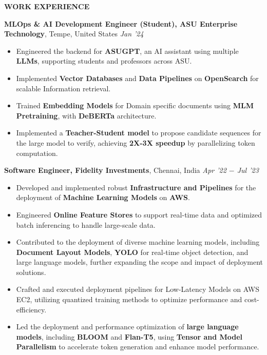 \documentclass[10pt,a4]{article}
\def\hrulefill{\leavevmode\leaders\hrule height 1pt\hfill\kern0pt}		%
\begin{document}
{		
		
\begin{flushleft}
    {\Large \textbf{WORK EXPERIENCE}} %

    \vspace{1.5mm}
    \textbf{\large MLOps \& AI Development Engineer (Student), ASU Enterprise Technology},   Tempe, United States \hfill \textit{\large Jan '24}	\\
    \begin{itemize}
        \item Engineered the backend for \textbf{ASUGPT}, an AI assistant using multiple \textbf{LLMs}, supporting students and professors across ASU.
        \item Implemented \textbf{Vector Databases} and \textbf{Data Pipelines} on \textbf{OpenSearch} for scalable Information retrieval.
        \item Trained \textbf{Embedding Models} for Domain specific documents using \textbf{MLM Pretraining}, with  \textbf{DeBERTa} architecture.
        \item Implemented a \textbf{Teacher-Student model} to propose candidate sequences for the large model to verify, achieving \textbf{2X-3X speedup} by parallelizing token computation.
    
    \end{itemize}	
    \vspace{0.5mm}
    \textbf{\large Software Engineer, Fidelity Investments},  Chennai, India \hfill \textit{\large Apr '22 $-$ Jul '23}	\\
    \begin{itemize}
        \item Developed and implemented robust \textbf{Infrastructure and Pipelines} for the deployment of \textbf{Machine Learning Models} on \textbf{AWS}.  
         \item Engineered \textbf{Online Feature Stores} to support real-time data and optimized batch inferencing to handle large-scale data.
         \item Contributed to the deployment of diverse machine learning models, including \textbf{Document Layout Models}, \textbf{YOLO} for real-time object detection, and large language models, further expanding the scope and impact of deployment solutions.
         \item Crafted and executed deployment pipelines for Low-Latency Models on AWS EC2, utilizing quantized training methods to optimize performance and cost-efficiency. 
         \item Led the deployment and performance optimization of \textbf{large language models}, including \textbf{BLOOM} and \textbf{Flan-T5}, using \textbf{Tensor and Model Parallelism} to accelerate token generation and enhance model performance.
    \end{itemize}	


\end{flushleft}}
\end{document}
